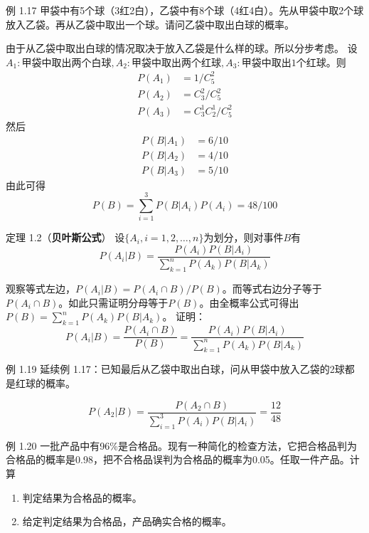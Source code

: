 \documentclass{beamer}
\begin{document}
	\begin{frame}
		例 1.17 甲袋中有5个球（3红2白），乙袋中有8个球（4红4白）。先从甲袋中取2个球放入乙袋。再从乙袋中取出一个球。请问乙袋中取出白球的概率。
		
		由于从乙袋中取出白球的情况取决于放入乙袋是什么样的球。所以分步考虑。
		设$A_1: \text{甲袋中取出两个白球}, A_2: \text{甲袋中取出两个红球}, A_3: \text{甲袋中取出1个红球}$。则
		\begin{align}
			P(A_1) &= 1 / C_5^2 \\
			P(A_2) &= C_3^2 / C_5^2 \\
			P(A_3) &= C_3^1 C_2^1 / C_5^2
		\end{align}
		然后
		\begin{align}
			P(B | A_1) &= 6 / 10 \\
			P(B | A_2) &= 4 / 10 \\
			P(B | A_3) &= 5 / 10
		\end{align}
		由此可得
		\[
		P(B) = \sum_{i = 1}^{3}P(B | A_i)P(A_i) = 48 / 100 
		\]
	\end{frame}
	
	\begin{frame}
		定理 1.2（\textbf{贝叶斯公式}） 设$\{A_i, i = 1, 2, \dots, n\}$为划分，则对事件$B$有
		\[
		P(A_i | B) = \frac{P(A_i)P(B | A_i)}{\sum_{k = 1}^{n}P(A_k)P(B | A_k)}
		\]
		
	\end{frame}
	
	\begin{frame}
		观察等式左边，$P(A_i | B) = P(A_i \cap B) / P(B)$。而等式右边分子等于$P(A_i \cap B)$。如此只需证明分母等于$P(B)$。由全概率公式可得出$P(B) = \sum_{k = 1}^{n}P(A_k)P(B | A_k)$。
		证明：
		\[
		P(A_i | B) = \frac{P(A_i \cap B)}{P(B)} = \frac{P(A_i)P(B | A_i)}{\sum_{k = 1}^{n}P(A_k)P(B | A_k)}
		\]
	\end{frame}
	
	\begin{frame}
		例 1.19 延续例 1.17：已知最后从乙袋中取出白球，问从甲袋中放入乙袋的2球都是红球的概率。
		
		
		\[
		P(A_2 | B) = \frac{P(A_2 \cap B)}{\sum_{i = 1}^{3}P(A_i)P(B | A_i)} = \frac{12}{48}
		\]
		
		例 1.20 一批产品中有96\%是合格品。现有一种简化的检查方法，它把合格品判为合格品的概率是0.98，把不合格品误判为合格品的概率为0.05。任取一件产品。计算
		\begin{enumerate}
			\item 判定结果为合格品的概率。
			\item 给定判定结果为合格品，产品确实合格的概率。
		\end{enumerate}
	\end{frame}
	
\end{document}
